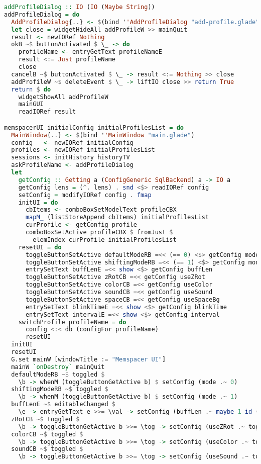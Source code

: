 \begin{lstlisting}[language=Haskell,caption=MemspacerUI.hs]
addProfileDialog :: IO (IO (Maybe String))
addProfileDialog = do
  AddProfileDialog{..} <- $(bind ''AddProfileDialog "add-profile.glade")
  let close = widgetHideAll addProfileW >> mainQuit
  result <- newIORef Nothing
  okB ~$ buttonActivated $ \_ -> do
    profileName <- entryGetText profileNameE
    result <:= Just profileName
    close
  cancelB ~$ buttonActivated $ \_ -> result <:= Nothing >> close
  addProfileW ~$ deleteEvent $ \_ -> liftIO close >> return True
  return $ do
    widgetShowAll addProfileW
    mainGUI
    readIORef result

memspacerUI initialConfig initialProfilesList = do
  MainWindow{..} <- $(bind ''MainWindow "main.glade")
  config   <- newIORef initialConfig
  profiles <- newIORef initialProfilesList
  sessions <- initHistory historyTV
  askProfileName <- addProfileDialog
  let
    getConfig :: Getting a (ConfigGeneric SqlBackend) a -> IO a
    getConfig lens = (^. lens) . snd <$> readIORef config
    setConfig = modifyIORef config . fmap
    initUI = do
      cbItems <- comboBoxSetModelText profileCBX
      mapM_ (listStoreAppend cbItems) initialProfilesList
      curProfile <- getConfig profile
      comboBoxSetActive profileCBX $ fromJust $
        elemIndex curProfile initialProfilesList
    resetUI = do
      toggleButtonSetActive defaultModeRB =<< (== 0) <$> getConfig mode
      toggleButtonSetActive shiftingModeRB =<< (== 1) <$> getConfig mode
      entrySetText buffLenE =<< show <$> getConfig buffLen
      toggleButtonSetActive zRotCB =<< getConfig useZRot
      toggleButtonSetActive colorCB =<< getConfig useColor
      toggleButtonSetActive soundCB =<< getConfig useSound
      toggleButtonSetActive spaceCB =<< getConfig useSpaceBg
      entrySetText blinkTimeE =<< show <$> getConfig blinkTime
      entrySetText intervalE =<< show <$> getConfig interval
    switchProfile profileName = do
      config <:< db (configFor profileName)
      resetUI
  initUI
  resetUI
  G.set mainW [windowTitle := "Memspacer UI"]
  mainW `onDestroy` mainQuit
  defaultModeRB ~$ toggled $
    \b -> whenM (toggleButtonGetActive b) $ setConfig (mode .~ 0)
  shiftingModeRB ~$ toggled $
    \b -> whenM (toggleButtonGetActive b) $ setConfig (mode .~ 1)
  buffLenE ~$ editableChanged $
    \e -> entryGetText e >>= \val -> setConfig (buffLen .~ maybe 1 id (readMaybe val))
  zRotCB ~$ toggled $
    \b -> toggleButtonGetActive b >>= \tog -> setConfig (useZRot .~ tog)
  colorCB ~$ toggled $
    \b -> toggleButtonGetActive b >>= \tog -> setConfig (useColor .~ tog)
  soundCB ~$ toggled $
    \b -> toggleButtonGetActive b >>= \tog -> setConfig (useSound .~ tog)

\end{lstlisting}
